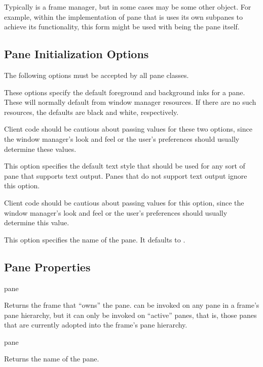 Typically  is a frame manager, but in some cases 
may be some other object.  For example, within the implementation of pane that
is uses its own subpanes to achieve its functionality, this form might be used
with  being the pane itself.


\subsection {Pane Initialization Options \label{pane-init}}

The following options must be accepted by all pane classes.


These options specify the default foreground and background inks for a pane.
These will normally default from window manager resources.  If there are no such
resources, the defaults are black and white, respectively.

Client code should be cautious about passing values for these two options, since
the window manager's look and feel or the user's preferences should usually
determine these values.


This option specifies the default text style that should be used for any sort of
pane that supports text output.  Panes that do not support text output ignore
this option.

Client code should be cautious about passing values for this option, since the
window manager's look and feel or the user's preferences should usually
determine this value.


This option specifies the name of the pane.  It defaults to .


\subsection {Pane Properties}

 {pane}

Returns the frame that ``owns'' the pane.   can be invoked on any
pane in a frame's pane hierarchy, but it can only be invoked on ``active''
panes, that is, those panes that are currently adopted into the frame's pane
hierarchy.

 {pane}

Returns the name of the pane.

